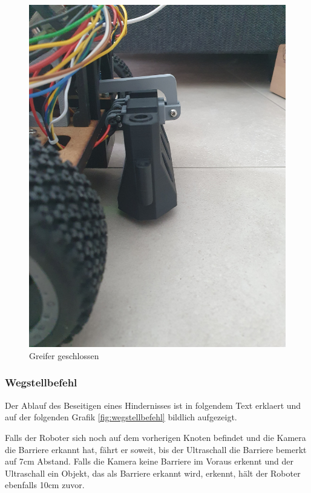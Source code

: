 \begin{figure}[H]
\begin{minipage}[b]{0.49\textwidth}
  \includegraphics[width=\textwidth, angle=-90]{assets/MT/greifer-close.jpg}
  \caption{Greifer geschlossen}
  \label{fig:griefe-rclose1}
\end{minipage}
\end{figure}
\subsubsection{Wegstellbefehl}
\label{hindernis-um-befehl}


Der Ablauf des Beseitigen eines Hindernisses ist in folgendem Text erklaert und auf der folgenden Grafik \ref{fig:wegstellbefehl} bildlich aufgezeigt.

Falls der Roboter sich noch auf dem vorherigen Knoten befindet und die Kamera die Barriere erkannt hat, fährt er soweit, bis der Ultraschall die Barriere bemerkt auf 7cm Abstand. 
Falls die Kamera keine Barriere im Voraus erkennt und der Ultraschall ein Objekt, das als Barriere erkannt wird, erkennt, hält der Roboter ebenfalls 10cm zuvor.

